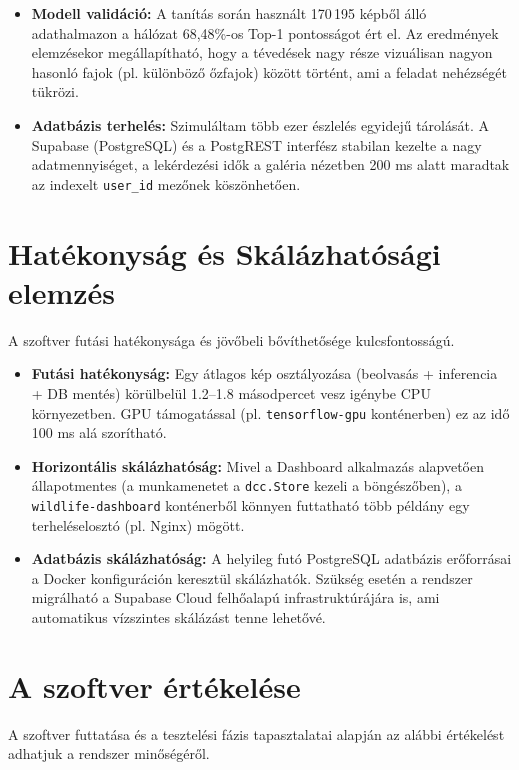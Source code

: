 \documentclass[
	parspace, %
]{elteikthesis}[2024/04/26]
\begin{document}
\begin{itemize}
    \item \textbf{Modell validáció:} A tanítás során használt 170\,195 képből álló adathalmazon a hálózat 68,48\%-os Top-1 pontosságot ért el. Az eredmények elemzésekor megállapítható, hogy a tévedések nagy része vizuálisan nagyon hasonló fajok (pl. különböző őzfajok) között történt, ami a feladat nehézségét tükrözi.
    \item \textbf{Adatbázis terhelés:} Szimuláltam több ezer észlelés egyidejű tárolását. A Supabase (PostgreSQL) és a PostgREST interfész stabilan kezelte a nagy adatmennyiséget, a lekérdezési idők a galéria nézetben 200 ms alatt maradtak az indexelt \texttt{user\_id} mezőnek köszönhetően.
\end{itemize}

\section{Hatékonyság és Skálázhatósági elemzés}
A szoftver futási hatékonysága és jövőbeli bővíthetősége kulcsfontosságú.

\begin{itemize}
    \item \textbf{Futási hatékonyság:} Egy átlagos kép osztályozása (beolvasás + inferencia + DB mentés) körülbelül 1.2--1.8 másodpercet vesz igénybe CPU környezetben. GPU támogatással (pl. \texttt{tensorflow-gpu} konténerben) ez az idő 100 ms alá szorítható.
    \item \textbf{Horizontális skálázhatóság:} Mivel a Dashboard alkalmazás alapvetően állapotmentes (a munkamenetet a \texttt{dcc.Store} kezeli a böngészőben), a \texttt{wildlife-dashboard} konténerből könnyen futtatható több példány egy terheléselosztó (pl. Nginx) mögött.
    \item \textbf{Adatbázis skálázhatóság:} A helyileg futó PostgreSQL adatbázis erőforrásai a Docker konfiguráción keresztül skálázhatók. Szükség esetén a rendszer migrálható a Supabase Cloud felhőalapú infrastruktúrájára is, ami automatikus vízszintes skálázást tenne lehetővé.
\end{itemize}

\section{A szoftver értékelése}
A szoftver futtatása és a tesztelési fázis tapasztalatai alapján az alábbi értékelést adhatjuk a rendszer minőségéről.
\end{document}
